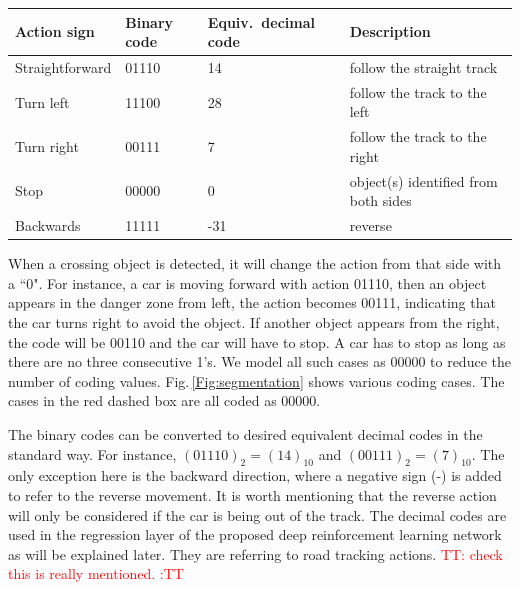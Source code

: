 \documentclass{svproc}
\renewcommand{\tt}[1]{\textcolor{red} {TT: #1 :TT} }
\begin{document}
\vspace{-0.5cm}
\begin{center}	\begin{tabular}{|C{2.5cm}|C{1.3cm}|C{2.5cm}|C{5.5cm}|}
\hline
		\textbf{Action sign} & \textbf{Binary code} & \textbf{Equiv.\ decimal code} & \textbf{Description} \\ \hline
	Straightforward	& 01110	& 14 & follow the straight track\\ \hline
	Turn left	& 11100 & 28 & follow the track to the left \\ \hline
	Turn right	& 00111 & 7 & follow the track to the right \\ \hline
	Stop& 00000 & 0 & object(s) identified from both sides\\ \hline
	Backwards& 11111 & -31 & reverse \\ \hline

	\end{tabular}
\end{center}

When a crossing object is detected, it will change the action from that side with a ``0". For instance, a car is moving forward with action 01110, then an object appears in the danger zone from left, the action becomes 00111, indicating that the car turns right to avoid the object. If another object appears from the right, the code will be 00110 and the car will have to stop. A car has to stop as long as there are no three consecutive 1's. We model all such cases as 00000 to reduce the number of coding values. Fig.\,\ref{Fig:segmentation} shows various coding cases. The cases in the red dashed box are all coded as 00000.

The binary codes can be converted to desired equivalent decimal codes in the standard way. For instance, $(01110)_2=(14)_{10}$ and $(00111)_2=(7)_{10}$. The only exception here is the backward direction, where a negative sign (-) is added to refer to the reverse movement. It is worth mentioning that the reverse action will only be considered if the car is being out of the track. The decimal codes are used in the regression layer of the proposed deep reinforcement learning network as will be explained later. They are referring to road tracking actions. \tt{check this is really mentioned.}

\end{document}
